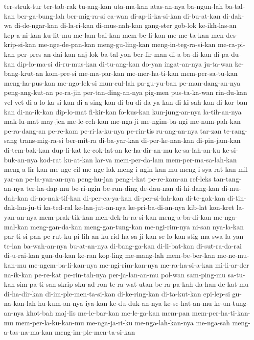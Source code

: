 {ter-struk-tur ter-tab-rak tu-ang-kan uta-ma-kan atas-an-nya ba-ngun-lah ba-tal-kan ber-ga-bung-lah
ber-mig-ra-si ca-wan di-ap-li-ka-si-kan di-bu-at-kan di-dak-wa di-de-ngar-kan di-la-ri-kan di-mus-nah-kan
gang-ster gob-lok ke-ikh-las-an kep-a-ni-kan ku-lit-mu me-lam-bai-kan mem-be-li-kan me-me-ta-kan
men-des-krip-si-kan me-nge-de-pan-kan meng-gu-ling-kan meng-in-teg-ra-si-kan me-ra-pi-kan per-pres an-dai-kan anj-lok
ba-tal-yon ber-fir-man di-a-ba-di-kan di-pa-du-kan dip-lo-ma-si di-ru-mus-kan di-tu-ang-kan do-yan
ingat-an-nya ju-ta-wan ke-bang-krut-an kom-pre-si me-ma-par-kan me-mer-ha-ti-kan mem-per-sa-tu-kan meng-ha-pus-kan
me-ngo-lek-si mun-cul-lah pa-gu-yu-ban pe-man-dang-an-nya peng-ang-kut-an pe-ra-jin per-tan-ding-an-nya pig-men
pus-ta-ka-wan rin-du-kan vel-vet di-a-lo-ka-si-kan di-a-sing-kan di-bu-di-da-ya-kan di-ki-sah-kan di-kor-ban-kan
di-na-ik-kan dip-lo-mat fi-kir-kan fo-kus-kan kun-jung-an-nya la-tih-an-nya mak-lu-mat may-jen
me-le-ceh-kan me-nga-ji me-ngim-ba-ngi me-num-pah-kan pe-ra-dang-an pe-re-kam pe-ri-la-ku-nya pe-rin-tis
ru-ang-an-nya tar-zan te-rang-sang trans-mig-ra-si ber-mit-ra di-ba-yar-kan di-per-ke-nan-kan di-pin-jam-kan
di-tem-bak-kan dup-li-kat ke-cok-lat-an ke-ha-dir-an-mu ke-sa-lah-an-ku ke-si-buk-an-nya kod-rat ku-at-kan
lar-va mem-per-da-lam mem-per-ma-sa-lah-kan meng-a-lir-kan me-nge-cil me-nge-lak meng-i-ngin-kan-mu meng-i-sya-rat-kan
mil-yar-an pe-la-yan-an-nya peng-hu-jan peng-i-kat pe-re-kam-an ref-leks tan-tang-an-nya ter-ha-dap-mu
be-ri-ngin be-run-ding de-dau-nan di-hi-dang-kan di-mu-dah-kan di-no-nak-tif-kan di-per-ca-ya-kan di-per-si-lah-kan
di-te-gak-kan di-tin-dak-lan-ju-ti ka-ted-ral ke-lan-jut-an-nya ke-pri-ba-di-an-nya kib-lat kon-kret la-yan-an-nya
mem-prak-tik-kan men-dek-la-ra-si-kan meng-a-ba-di-kan me-nga-mal-kan meng-gan-da-kan meng-gan-tung-kan me-ngi-rim-nya ni-san
nya-la-kan par-ti-si-pan pe-rut-ku pi-lih-an-ku rid-ha sa-ji-kan se-lo-kan stig-ma
swa-la-yan te-lan ba-wah-an-nya bu-at-an-nya di-bang-ga-kan di-li-bat-kan di-sut-ra-da-rai di-u-rai-kan
gun-du-kan ke-ran kop-ling me-mang-lah mem-be-ber-kan me-ne-mu-kan-mu me-ngem-ba-li-kan-nya me-ngi-rim-kan-nya
me-ra-ha-si-a-kan mi-li-ar-der na-ik-kan pe-re-kat pe-rin-tah-nya per-ja-lan-an-mu pol-wan sam-ping-mu
sa-tu-kan sim-pa-ti-san skrip sku-ad-ron te-ra-wat utan be-ra-pa-kah da-han
de-kat-mu di-ha-dir-kan di-im-ple-men-ta-si-kan di-ke-ring-kan di-ta-kut-kan epi-lep-si gu-na-kan-lah hu-kum-an-nya
iya-kan ke-du-duk-an-nya ke-se-hat-an-mu ke-un-tung-an-nya khot-bah maj-lis me-le-bar-kan me-le-ga-kan
mem-pan mem-per-ha-ti-kan-mu mem-per-la-ku-kan-mu me-nga-ja-ri-ku me-nga-lah-kan-nya me-nga-sah meng-a-tas-na-ma-kan meng-im-ple-men-ta-si-kan
}
